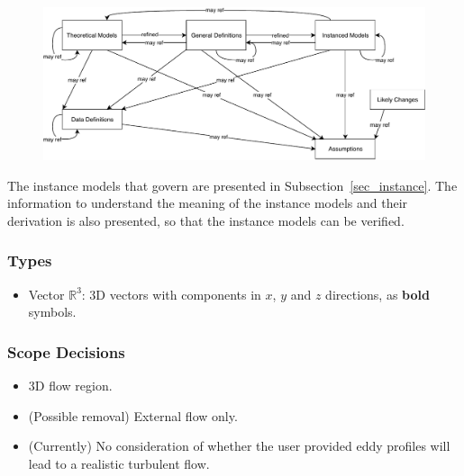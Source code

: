 \documentclass[12pt]{article}
\begin{document}

\begin{figure}[H]
  \includegraphics[scale=0.9]{RelationsBetweenTM_GD_IM_DD_A.pdf}
\end{figure}

The instance models that govern \progname{} are presented in
Subsection~\ref{sec_instance}.  The information to understand the meaning of the
instance models and their derivation is also presented, so that the instance
models can be verified.

\subsubsection{Types}

\begin{itemize}
  \item Vector $\mathbb{R}^3$: 3D vectors with components in $x$, $y$ and $z$ directions, as \textbf{bold} symbols.
\end{itemize}


\subsubsection{Scope Decisions}
\begin{itemize}
  \item 3D flow region.
  \item (Possible removal) External flow only.
  \item (Currently) No consideration of whether the user provided eddy profiles will lead to a realistic turbulent flow.
\end{itemize}
\end{document}

